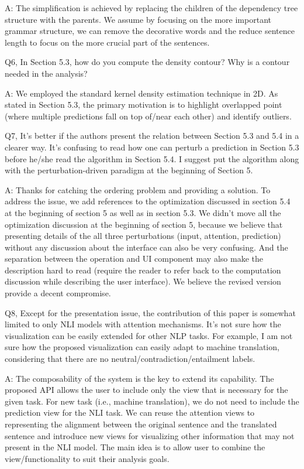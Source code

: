 A: The simplification is achieved by replacing the children of the dependency tree structure with the parents. We assume by focusing on the more important grammar structure, we can remove the decorative words and the reduce sentence length to focus on the more crucial part of the sentences.

Q6, In Section 5.3, how do you compute the density contour? Why is a contour needed in the analysis?

A: We employed the standard kernel density estimation technique in 2D. As stated in Section 5.3, the primary motivation is to highlight overlapped point (where multiple predictions fall on top of/near each other) and identify outliers.

Q7, It's better if the authors present the relation between Section 5.3 and 5.4 in a clearer way. It's confusing to read how one can perturb a prediction in Section 5.3 before he/she read the algorithm in Section 5.4. I suggest put the algorithm along with the perturbation-driven paradigm at the beginning of Section 5.

A: Thanks for catching the ordering problem and providing a solution. To address the issue, we add references to the optimization discussed in section 5.4 at the beginning of section 5 as well as in section 5.3. We didn't move all the optimization discussion at the beginning of section 5, because we believe that presenting details of the all three perturbations (input, attention, prediction) without any discussion about the interface can also be very confusing. And the separation between the operation and UI component may also make the description hard to read (require the reader to refer back to the computation discussion while describing the user interface). We believe the revised version provide a decent compromise.

Q8, Except for the presentation issue, the contribution of this paper is somewhat limited to only NLI models with attention mechanisms. It's not sure how the visualization can be easily extended for other NLP tasks. For example, I am not sure how the proposed visualization can easily adapt to machine translation, considering that there are no neutral/contradiction/entailment labels.

A: The composability of the system is the key to extend its capability. The proposed API allows the user to include only the view that is necessary for the given task. For new task (i.e., machine translation), we do not need to include the prediction view for the NLI task. We can reuse the attention views to representing the alignment between the original sentence and the translated sentence and introduce new views for visualizing other information that may not present in the NLI model. The main idea is to allow user to combine the view/functionality to suit their analysis goals.

